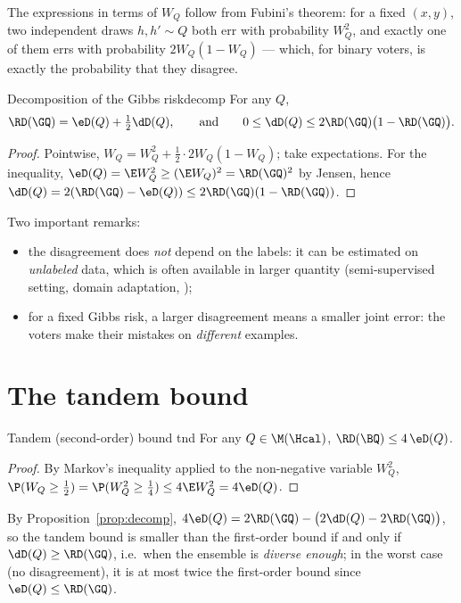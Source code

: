 The expressions in terms of $W_Q$ follow from Fubini's theorem: for a fixed
$(x,y)$, two independent draws $h,h'\sim Q$ both err with probability $W_Q^2$,
and exactly one of them errs with probability $2W_Q(1-W_Q)$ --- which, for
binary voters, is exactly the probability that they disagree.

\begin{proposition}{Decomposition of the Gibbs risk}{decomp}
For any $Q$,
\[
\RD(\GQ)=\eD(Q)+\tfrac12\dD(Q),\qquad\text{and}\qquad
0\leq\dD(Q)\leq2\RD(\GQ)\big(1-\RD(\GQ)\big).
\]
\end{proposition}
\begin{proof}
Pointwise, $W_Q=W_Q^2+\frac12\cdot2W_Q(1-W_Q)$; take expectations. For the
inequality, $\eD(Q)=\E W_Q^2\geq(\E W_Q)^2=\RD(\GQ)^2$ by Jensen, hence
$\dD(Q)=2(\RD(\GQ)-\eD(Q))\leq2\RD(\GQ)(1-\RD(\GQ))$.
\end{proof}

Two important remarks:
\begin{itemize}
\item the disagreement does \emph{not} depend on the labels: it can be
      estimated on \emph{unlabeled} data, which is often available in larger
      quantity (semi-supervised setting, domain adaptation, \citealp{germain2020pac});
\item for a fixed Gibbs risk, a larger disagreement means a smaller joint error:
      the voters make their mistakes on \emph{different} examples.
\end{itemize}

\section{The tandem bound}

\begin{theorem}{Tandem (second-order) bound \citep{masegosa2020second}}{tnd}
For any $Q\in\M(\Hcal)$, $\RD(\BQ)\leq4\,\eD(Q)$.
\end{theorem}
\begin{proof}
By Markov's inequality applied to the non-negative variable $W_Q^2$,
$\P(W_Q\geq\frac12)=\P(W_Q^2\geq\frac14)\leq4\E W_Q^2=4\eD(Q)$.
\end{proof}

By Proposition~\ref{prop:decomp}, $4\eD(Q)=2\RD(\GQ)-\big(2\dD(Q)-2\RD(\GQ)\big)$, so the
tandem bound is smaller than the first-order bound if and only if
$\dD(Q)\geq\RD(\GQ)$, i.e.\ when the ensemble is \emph{diverse enough}; in the
worst case (no disagreement), it is at most twice the first-order bound since
$\eD(Q)\leq\RD(\GQ)$.


